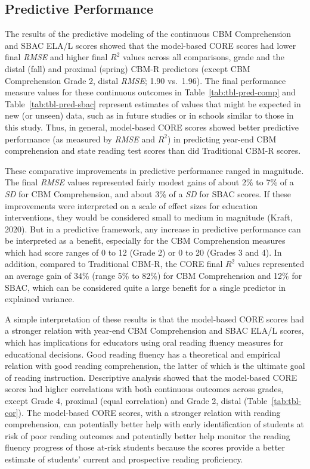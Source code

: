 \documentclass[
  english,
  man, fleqn, noextraspace]{apa6}
\begin{document}
\hypertarget{predictive-performance}{%
\subsection{Predictive Performance}\label{predictive-performance}}

The results of the predictive modeling of the continuous CBM Comprehension and SBAC ELA/L scores showed that the model-based CORE scores had lower final \emph{RMSE} and higher final \(R^2\) values across all comparisons, grade and the distal (fall) and proximal (spring) CBM-R predictors (except CBM Comprehension Grade 2, distal \emph{RMSE}; 1.90 vs.~1.96). The final performance measure values for these continuous outcomes in Table~\ref{tab:tbl-pred-comp} and Table~\ref{tab:tbl-pred-sbac} represent estimates of values that might be expected in new (or unseen) data, such as in future studies or in schools similar to those in this study. Thus, in general, model-based CORE scores showed better predictive performance (as measured by \emph{RMSE} and \(R^2\)) in predicting year-end CBM comprehension and state reading test scores than did Traditional CBM-R scores.

These comparative improvements in predictive performance ranged in magnitude. The final \emph{RMSE} values represented fairly modest gains of about 2\% to 7\% of a \emph{SD} for CBM Comprehension, and about 3\% of a \emph{SD} for SBAC scores. If these improvements were interpreted on a scale of effect sizes for education interventions, they would be considered small to medium in magnitude (Kraft, 2020). But in a predictive framework, any increase in predictive performance can be interpreted as a benefit, especially for the CBM Comprehension measures which had score ranges of 0 to 12 (Grade 2) or 0 to 20 (Grades 3 and 4). In addition, compared to Traditional CBM-R, the CORE final \(R^2\) values represented an average gain of 34\% (range 5\% to 82\%) for CBM Comprehension and 12\% for SBAC, which can be considered quite a large benefit for a single predictor in explained variance.

A simple interpretation of these results is that the model-based CORE scores had a stronger relation with year-end CBM Comprehension and SBAC ELA/L scores, which has implications for educators using oral reading fluency measures for educational decisions. Good reading fluency has a theoretical and empirical relation with good reading comprehension, the latter of which is the ultimate goal of reading instruction. Descriptive analysis showed that the model-based CORE scores had higher correlations with both continuous outcomes across grades, except Grade 4, proximal (equal correlation) and Grade 2, distal (Table~\ref{tab:tbl-cor}). The model-based CORE scores, with a stronger relation with reading comprehension, can potentially better help with early identification of students at risk of poor reading outcomes and potentially better help monitor the reading fluency progress of those at-risk students because the scores provide a better estimate of students' current and prospective reading proficiency.
\end{document}
